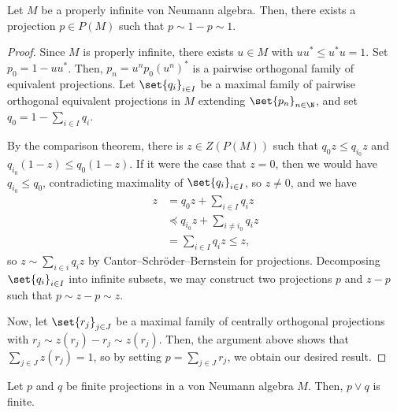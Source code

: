 \documentclass[10pt]{mypackage}
\begin{document}
\begin{lemma}
  Let $M$ be a properly infinite von Neumann algebra. Then, there exists a projection $p\in P(M)$ such that $p\sim 1-p \sim 1$.
\end{lemma}
\begin{proof}
  Since $M$ is properly infinite, there exists $u\in M$ with $uu^{\ast}\leq u^{\ast}u = 1$. Set $p_0 = 1-uu^{\ast}$. Then, $p_n = u^{n}p_0\left( u^n \right)^{\ast}$ is a pairwise orthogonal family of equivalent projections. Let $\set{q_i}_{i\in I}$ be a maximal family of pairwise orthogonal equivalent projections in $M$ extending $\set{p_n}_{n\in \N}$, and set $q_0 = 1-\sum_{i\in I}q_i$.

  By the comparison theorem, there is $z\in Z(P(M))$ such that $q_0z\leq q_{i_0}z$ and $q_{i_0}\left( 1-z \right)\leq q_0\left( 1-z \right)$. If it were the case that $z = 0$, then we would have $q_{i_0}\leq q_0$, contradicting maximality of $\set{q_i}_{i\in I}$,  so $z\neq 0$, and we have
  \begin{align*}
    z &= q_0 z + \sum_{i\in I}q_i z\\
      &\preceq q_{i_0}z + \sum_{i\neq i_0} q_{i} z\\
      &= \sum_{i\in I}q_i z \leq z,
  \end{align*}
  so $z\sim \sum_{i\in i}q_i z$ by Cantor--Schröder--Bernstein for projections. Decomposing $\set{q_i}_{i\in I}$ into infinite subsets, we may construct two projections $p$ and $z-p$ such that $p \sim z-p \sim z$.

  Now, let $\set{r_j}_{j\in J}$ be a maximal family of centrally orthogonal projections with $r_j\sim z\left( r_j \right)-r_j\sim z\left( r_j \right)$. Then, the argument above shows that $\sum_{j\in J}z\left( r_j \right) = 1$, so by setting $p = \sum_{j\in J}r_j$, we obtain our desired result.
\end{proof}
\begin{proposition}
  Let $p$ and $q$ be finite projections in a von Neumann algebra $M$. Then, $p\vee q$ is finite.
\end{proposition}
\end{document}
